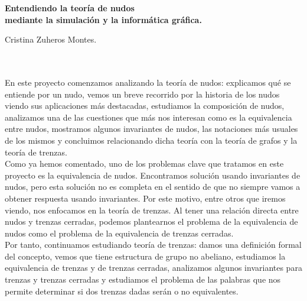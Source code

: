 
\cleardoublepage
\thispagestyle{empty}

\begin{center}
{\large\bfseries Entendiendo la teoría de nudos\\
	 mediante la simulación y la informática gráfica.}\\
\end{center}
\begin{center}
Cristina Zuheros Montes.\\
\end{center}

\\

\vspace{0.7cm}
\\
En este proyecto comenzamos analizando la teoría de nudos: explicamos qué se entiende por un nudo, vemos un breve recorrido por la historia de los nudos viendo sus aplicaciones más destacadas, estudiamos la composición de nudos, analizamos una de las cuestiones que más nos interesan como es la equivalencia entre nudos, mostramos algunos invariantes de nudos, las notaciones más usuales de los mismos y concluimos relacionando dicha teoría con la teoría de grafos y la teoría de trenzas.\\

Como ya hemos comentado, uno de los problemas clave que tratamos en este proyecto es la equivalencia de nudos. Encontramos solución usando invariantes de nudos, pero esta solución no es completa en el sentido de que no siempre vamos a obtener respuesta usando invariantes. Por este motivo, entre otros que iremos viendo, nos enfocamos en la teoría de trenzas. Al tener una relación directa entre nudos y trenzas cerradas, podemos plantearnos el problema de la equivalencia de nudos como el problema de la equivalencia de trenzas cerradas.\\ 

Por tanto, continuamos estudiando teoría de trenzas: damos una definición formal del concepto, vemos que tiene estructura de grupo no abeliano, estudiamos la equivalencia de trenzas y de trenzas cerradas, analizamos algunos invariantes para trenzas y trenzas cerradas y estudiamos el problema de las palabras que nos permite determinar si dos trenzas dadas serán o no equivalentes. \\

